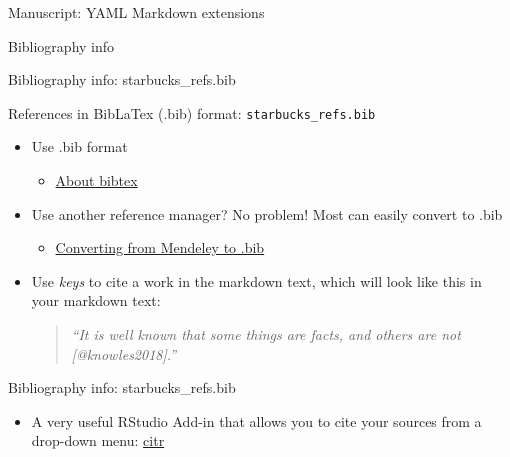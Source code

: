 \documentclass[
  ignorenonframetext,
]{beamer}
\providecommand{\tightlist}{%
  \setlength{\itemsep}{0pt}\setlength{\parskip}{0pt}}
\begin{document}
\begin{frame}[fragile]
\begin{block}{Manuscript: YAML \textbar{} Markdown extensions}
\end{block}

\begin{block}{Bibliography info}

\end{block}

\begin{block}{Bibliography info: starbucks\_refs.bib}

References in BibLaTex (.bib) format: \texttt{starbucks\_refs.bib}

\begin{itemize}
\item
  Use .bib format

  \begin{itemize}
  \tightlist
  \item
    \href{http://www.bibtex.org/Using/}{About bibtex}
  \end{itemize}
\item
  Use another reference manager? No problem! Most can easily convert to
  .bib

  \begin{itemize}
  \tightlist
  \item
    \href{https://blog.mendeley.com/2012/03/24/how-to-series-generate-bibtex-files-for-your-collections-for-use-in-latex-part-3-of-12/}{Converting
    from Mendeley to .bib}
  \end{itemize}
\item
  Use \emph{keys} to cite a work in the markdown text, which will look
  like this in your markdown text:

  \begin{quote}
  \emph{``It is well known that some things are facts, and others are
  not {[}@knowles2018{]}.''}
  \end{quote}
\end{itemize}

\end{block}

\begin{block}{Bibliography info: starbucks\_refs.bib}

\begin{itemize}
\tightlist
\item
  A very useful RStudio Add-in that allows you to cite your sources from
  a drop-down menu: \href{https://github.com/crsh/citr}{citr}
\end{itemize}


\end{block}
\end{frame}
\end{document}
